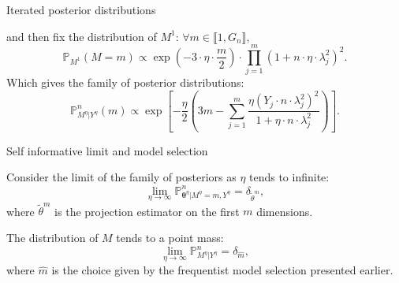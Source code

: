 \documentclass[final,hyperref={pdfpagelabels=false}]{beamer}
\begin{document}
\begin{frame}[t]
\begin{columns}[t]
\begin{column}{.30\textwidth}
\begin{block}{\rule{0pt}{2.5ex} Iterated posterior distributions}
and then fix the distribution of $M^{1}$: $\forall m \in \llbracket 1, G_{n} \rrbracket, $
\[\mathbb{P}_{M^{1}}(M = m) \propto \exp\left(-3 \cdot \eta \cdot \frac{m}{2} \right) \cdot \prod\limits_{j = 1}^{m} \left(1 + n \cdot \eta \cdot \lambda_{j}^{2}\right)^{2}.\]
Which gives the family of posterior distributions:
\textcolor{red!90!black}{\[\mathbb{P}_{M^{\eta} \vert Y^{\eta}}^{n}(m) \propto \exp\!\!\left[- \frac{\eta}{2} \left( 3 m - \sum\limits_{j = 1}^{m} \frac{\eta\left(Y_{j} \cdot n \cdot \lambda_{j}^{2}\right)^{2}}{1 + \eta \cdot n \cdot \lambda_{j}^{2}} \right)\right].\]}
\end{block}


\begin{block}{\rule{0pt}{2.5ex} Self informative limit and model selection}
Consider the limit of the family of posteriors as $\eta$ tends to infinite:
\[\lim_{\eta \rightarrow \infty} \mathbb{P}_{\boldsymbol{\theta}^{\eta} \vert M^{\eta} = m, Y^{\eta}}^{n} = \delta_{\tilde{\theta}^{m}},\]
where $\tilde{\theta}^{m}$ is the projection estimator on the first $m$ dimensions.

The distribution of $M$ tends to a point mass:
\[\lim_{\eta \rightarrow \infty} \mathbb{P}_{M^{\eta}\vert Y^{\eta}}^{n} = \delta_{\widehat{m}},\]
where $\widehat{m}$ is the choice given by the frequentist model selection presented earlier.


\end{block}
\end{column}
\end{columns}
\end{frame}
\end{document}
